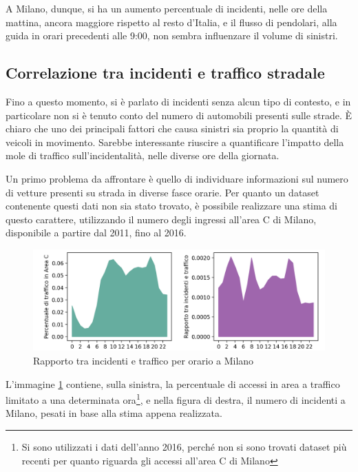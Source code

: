 \documentclass[a4paper,12pt]{report}
\begin{document}
A Milano, dunque, si ha un aumento percentuale di incidenti, nelle ore della mattina, 
ancora maggiore rispetto al resto d'Italia, e il flusso di pendolari, 
alla guida in orari precedenti alle 9:00, 
non sembra influenzare il volume di sinistri. 

\subsection{Correlazione tra incidenti e traffico stradale}

Fino a questo momento, si è parlato di incidenti senza alcun tipo di contesto, 
e in 
particolare non si è tenuto conto del numero di automobili presenti sulle strade. 
\`E chiaro che uno dei principali fattori che causa sinistri sia proprio 
la quantità di veicoli in movimento. 
Sarebbe interessante riuscire a quantificare l'impatto della mole di traffico 
sull'incidentalità, nelle diverse ore della giornata.

Un primo problema da affrontare è quello di individuare informazioni sul 
numero di vetture presenti su strada in diverse fasce orarie. 
Per quanto un dataset contenente questi dati non sia stato trovato, 
è possibile realizzare una stima di questo carattere, 
utilizzando il numero degli ingressi all'area C di Milano, 
disponibile a partire dal 2011, fino al 2016. 

\begin{figure}
    \includegraphics[width=\linewidth]{../src/area_c/rapporto_orario.png}
    \caption{Rapporto tra incidenti e traffico per orario a Milano}
    \label{fig:rapporto-incidenti-traffico}
\end{figure}

L'immagine \ref{fig:rapporto-incidenti-traffico} contiene, sulla sinistra, 
la percentuale di accessi in area a traffico limitato a una determinata 
ora\footnote{Si sono utilizzati i dati dell'anno 2016, perché non si sono trovati 
dataset più recenti per quanto riguarda gli accessi all'area C di Milano}, 
e nella figura di destra, il numero di incidenti a Milano, pesati in base alla 
stima appena realizzata. 
\end{document}
